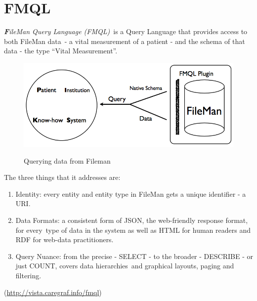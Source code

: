 \documentclass[DIV=calc, paper=a4, fontsize=12pt, onecolumn]{scrartcl}	 %
\newcommand{\initial}[1]{ %
\lettrine[lines=3,lhang=0.3,nindent=0em,slope=0em]{
\color{DarkBlue}
{\textbf{\textit{#1}}}}{}}
\begin{document}

  \section[FileMan Query Language (FMQL)]{FMQL}
  \label{sec:fmql}

  \initial{F}\textit{ileMan Query Language (FMQL)}\
  is a Query Language that provides access to both FileMan data\
  - a vital measurement of a patient - and the schema of that data - the type ``Vital Measurement''.\\
  
  \begin{figure}[ht!]
    \centering
    \includegraphics[scale=0.4]{fmqlFromFileMan.png}
    \caption{Querying data from Fileman}
    \cite[Fig.~1]{belleau_bio2rdf:_2008}
    \label{fig:fmql}
  \end{figure}  

  \noindent The three things that it addresses are:
  \begin{enumerate}
    \item Identity: every entity and entity type in FileMan gets a unique identifier - a URI.
    \item Data Formats: a consistent form of JSON, the web-friendly response format, for every\
    type of data in the system as well as HTML for human readers and RDF for web-data practitioners.\
    \item Query Nuance: from the precise - SELECT - to the broader - DESCRIBE - or just COUNT, covers data hierarchies\
    and graphical layouts, paging and filtering.
  \end{enumerate}
  (\url{http://vista.caregraf.info/fmql})

\end{document}
